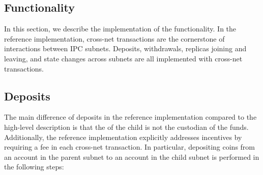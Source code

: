 
\subsection{Functionality} 
\label{sec:refimplfunc}
In this section, we describe the implementation of the functionality. In the reference implementation, cross-net transactions are the cornerstone of interactions between IPC subnets. Deposits, withdrawals, replicas joining and leaving, and state changes across subnets are all implemented with cross-net transactions.

\subsection{Deposits}
The main difference of deposits in the reference implementation compared to the high-level description is that the \sa of the child is not the custodian of the funds. Additionally, the reference implementation explicitly addresses incentives by requiring a fee in each cross-net transaction. In particular, depositing  coins from an account  in the parent subnet  to an account  in the child subnet  is performed in the following steps:

